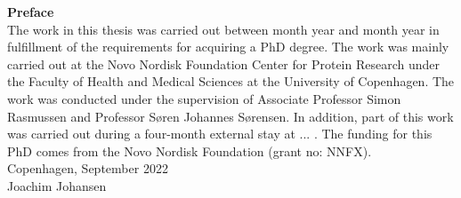 \noindent
\textbf{Preface}\\
The work in this thesis was carried out between month year and month year in fulfillment of the requirements for acquiring a PhD degree. 
The work was mainly carried out at the Novo Nordisk Foundation Center for Protein Research under the Faculty of Health and Medical Sciences at the University of Copenhagen.
The work was conducted under the supervision of Associate Professor Simon Rasmussen and Professor Søren Johannes Sørensen. In addition, part of this work was carried out during a four-month external stay at ... .
The funding for this PhD comes from the Novo Nordisk Foundation (grant no: NNFX). \\

\noindent
Copenhagen, September 2022\\
\noindent
Joachim Johansen